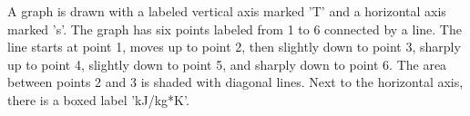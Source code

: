 A graph is drawn with a labeled vertical axis marked 'T' and a horizontal axis marked 's'. The graph has six points labeled from 1 to 6 connected by a line. The line starts at point 1, moves up to point 2, then slightly down to point 3, sharply up to point 4, slightly down to point 5, and sharply down to point 6. The area between points 2 and 3 is shaded with diagonal lines. Next to the horizontal axis, there is a boxed label 'kJ/kg*K'.